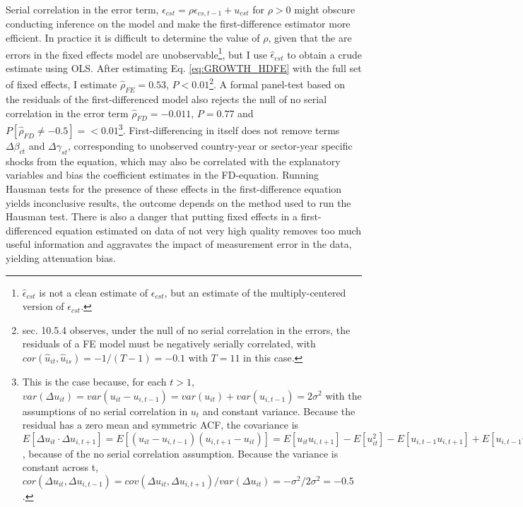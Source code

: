 \documentclass[a4paper]{article}
\begin{document}
Serial correlation in the error term, $\epsilon_{cst} = \rho \epsilon_{cs,t-1} + u_{cst}$ for $\rho > 0$ might obscure conducting inference on the model and make the first-difference estimator more efficient. In practice it is difficult to determine the value of $\rho$, given that the are errors in the fixed effects model are unobservable\footnote{$\hat{\epsilon}_{cst}$ is not a clean estimate of $\epsilon_{cst}$, but an estimate of the multiply-centered version of $\epsilon_{cst}$.}, but I use $\hat{\epsilon}_{cst}$ to obtain a crude estimate using OLS. After estimating Eq. \ref{eq:GROWTH_HDFE} with the full set of fixed effects, I estimate $\hat{\rho}_{FE} = 0.53$, $P<0.01$\footnote{\citet{wooldridge2010econometric} sec. 10.5.4 observes, under the null of no serial correlation in the errors, the residuals of a FE model must be negatively serially correlated, with $cor(\hat{u}_{it}, \hat{u}_{is})=-1/(T-1) = -0.1$ with $T = 11$ in this case.}. A formal panel-test based on the residuals of the first-differenced model also rejects the null of no serial correlation in the error term $\hat{\rho}_{FD} = -0.011$, $P=0.77$ and $P[\hat{\rho}_{FD} \neq -0.5]=<0.01$\footnote{This is the case because, for each $t > 1$, $var(\Delta u_{it}) = var(u_{it} - u_{i,t-1}) = var(u_{it}) + var(u_{i,t-1}) = 2\sigma^2$ with the assumptions of no serial correlation in $u_t$ and constant variance. Because the residual has a zero mean and symmetric ACF, the covariance is $E[\Delta u_{it}⋅\Delta u_{i,t+1}] = E[(u_{it} - u_{i,t-1})(u_{i,t+1} - u_{it})] = E[u_{it} u_{i,t+1}] - E[u_{it}^2] - E[u_{i,t-1} u_{i,t+1}] + E[u_{i,t-1} u_{it}] = -E[u_{it}^2] = -\sigma^2$, because of the no serial correlation assumption. Because the variance is constant across t, $cor(\Delta u_{it},  \Delta u_{i,t-1}) = cov(\Delta u_{it},  \Delta u_{i,t+1})/var(\Delta u_{it}) = -\sigma^2/2\sigma^2 = -0.5$.}. First-differencing in itself does not remove terms $\Delta\beta_{ct}$ and $\Delta\gamma_{st}$, corresponding to unobserved country-year or sector-year specific shocks from the equation, which may also be correlated with the explanatory variables and bias the coefficient estimates in the FD-equation. Running Hausman tests for the presence of these effects in the first-difference equation yields inconclusive results, the outcome depends on the method used to run the Hausman test. There is also a danger that putting fixed effects in a first-differenced equation estimated on data of not very high quality removes too much useful information and aggravates the impact of measurement error in the data, yielding attenuation bias.   \newline
\end{document}
